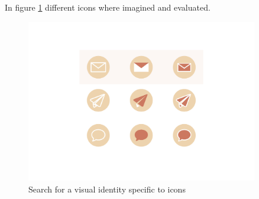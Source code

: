 In figure \ref{fig:id seek icon} different icons where imagined and evaluated.

\begin{figure}[!htb]
    \centering
    \includegraphics[width=0.9\textwidth,keepaspectratio]{chap/designFig/VestaRechercheIdentity5}
    \caption{Search for a visual identity specific to icons}
    \label{fig:id seek icon}
\end{figure}
